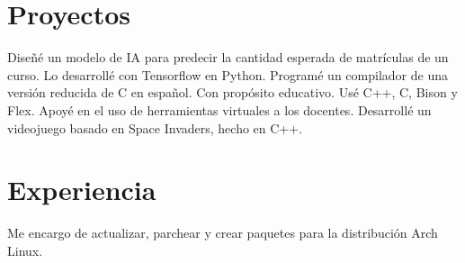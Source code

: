 \documentclass[10pt, a4paper]{moderncv}
\begin{document}
\section{Proyectos}
{
	Diseñé un modelo de IA para predecir la cantidad esperada de matrículas de un curso.
	Lo desarrollé con Tensorflow en Python.
}
{
	Programé un compilador de una versión reducida de C en español.
	Con propósito educativo.
	Usé C++, C, Bison y Flex.
}
{
	Apoyé en el uso de herramientas virtuales a los docentes.
}
{
	Desarrollé un videojuego basado en Space Invaders, hecho en C++.
}

\section{Experiencia}
{
	Me encargo de actualizar, parchear y crear paquetes para la distribución
	Arch Linux.
}

\end{document}
